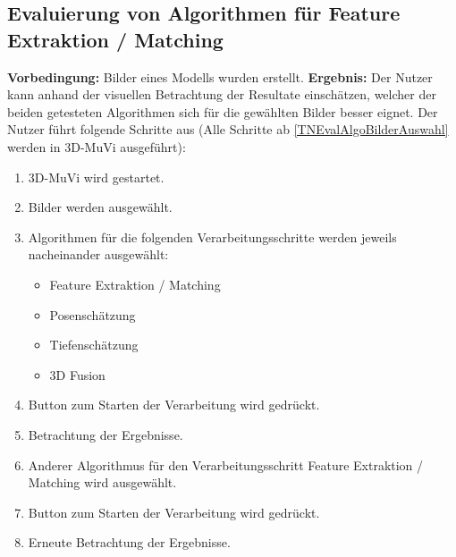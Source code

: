 \subsection{Evaluierung von Algorithmen für Feature Extraktion / Matching}
\label{TNEvalAlgo}
\textbf{Vorbedingung:} Bilder eines Modells wurden erstellt. \newline
\textbf{Ergebnis:} Der Nutzer kann anhand der visuellen Betrachtung der Resultate einschätzen, welcher der beiden getesteten Algorithmen sich für die gewählten Bilder besser eignet. \newline
Der Nutzer führt folgende Schritte aus (Alle Schritte ab \ref{TNEvalAlgoBilderAuswahl} werden in 3D-MuVi ausgeführt):
\begin{enumerate}
	\item 3D-MuVi wird gestartet.
	\item \label{TNEvalAlgoBilderAuswahl} Bilder werden ausgewählt.
	\item Algorithmen für die folgenden Verarbeitungsschritte werden jeweils nacheinander ausgewählt:
	\begin{itemize}
		\item Feature Extraktion / Matching
		\item Posenschätzung
		\item Tiefenschätzung
		\item 3D Fusion
	\end{itemize}
	\item Button zum Starten der Verarbeitung wird gedrückt.
	\item Betrachtung der Ergebnisse.
	\item Anderer Algorithmus für den Verarbeitungsschritt Feature Extraktion / Matching wird ausgewählt.
	\item Button zum Starten der Verarbeitung wird gedrückt.
	\item Erneute Betrachtung der Ergebnisse.
\end{enumerate}

